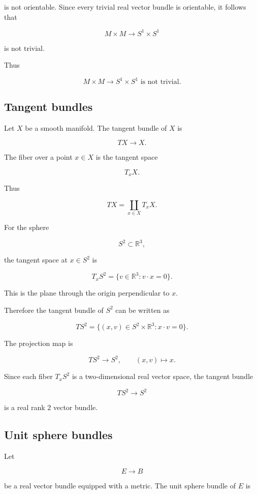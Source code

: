 \documentclass[12pt,a4paper]{article}
\newcommand{\R}{\mathbb{R}}
\theoremstyle{notespace}
\begin{document}
	is not orientable. Since every trivial real vector bundle is orientable, it follows that
	
	\[
	M\times M\to S^{1}\times S^{1}
	\]
	
	is not trivial.
	
	Thus
	
	\[
	\boxed{
		M\times M\to S^{1}\times S^{1}\text{ is not trivial.}
	}
	\]
	
	\subsection{Tangent bundles}
	
	Let \(X\) be a smooth manifold. The tangent bundle of \(X\) is
	
	\[
	TX\to X.
	\]
	
	The fiber over a point \(x\in X\) is the tangent space
	
	\[
	T_xX.
	\]
	
	Thus
	
	\[
	TX=\coprod_{x\in X}T_xX.
	\]
	
	For the sphere
	
	\[
	S^{2}\subset \R^{3},
	\]
	
	the tangent space at \(x\in S^{2}\) is
	
	\[
	T_xS^{2}
	=
	\{v\in \R^{3}:v\cdot x=0\}.
	\]
	
	This is the plane through the origin perpendicular to \(x\).
	
	Therefore the tangent bundle of \(S^{2}\) can be written as
	
	\[
	TS^{2}
	=
	\{(x,v)\in S^{2}\times \R^{3}:x\cdot v=0\}.
	\]
	
	The projection map is
	
	\[
	TS^{2}\to S^{2},
	\qquad
	(x,v)\mapsto x.
	\]
	
	Since each fiber \(T_xS^{2}\) is a two-dimensional real vector space, the tangent bundle
	
	\[
	TS^{2}\to S^{2}
	\]
	
	is a real rank \(2\) vector bundle.
	
	\subsection{Unit sphere bundles}
	
	Let
	
	\[
	E\to B
	\]
	
	be a real vector bundle equipped with a metric. The unit sphere bundle of \(E\) is
	
\end{document}
